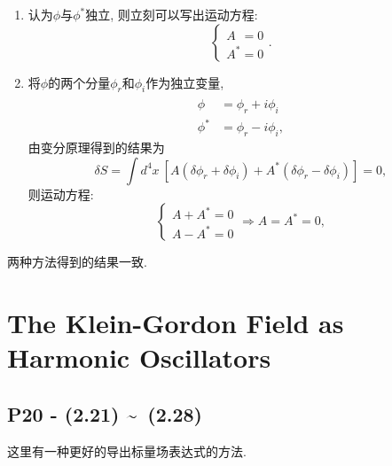 \begin{enumerate}
  \item 认为$\phi$与$\phi^*$独立, 则立刻可以写出运动方程:
        \begin{equation*}
          \left\{\begin{array}{c}
            A^{\phantom{*}} = 0 \\
            A^* = 0
          \end{array}\right..
        \end{equation*}

  \item 将$\phi$的两个分量$\phi_r$和$\phi_i$作为独立变量,
        \begin{align*}
          \phi^{\phantom{*}} & = \phi_r + i\phi_i  \\
          \phi^*             & = \phi_r - i\phi_i,
        \end{align*}
        由变分原理得到的结果为
        \begin{equation*}
          \delta S = \int d^4x\ [A(\delta\phi_r+\delta\phi_i) + A^*(\delta\phi_r-\delta\phi_i)] = 0,
        \end{equation*}
        则运动方程:
        \begin{equation*}
          \left\{\begin{array}{c}
            A + A^* = 0 \\
            A - A^* = 0
          \end{array}\right.\Rightarrow A = A^* = 0,
        \end{equation*}
\end{enumerate}
两种方法得到的结果一致.

\section{The Klein-Gordon Field as Harmonic Oscillators}

\subsection{P20 - (2.21) \textasciitilde \ (2.28)} \label{subsubsec: KG_Field_expression}

这里有一种更好的导出标量场表达式的方法.

